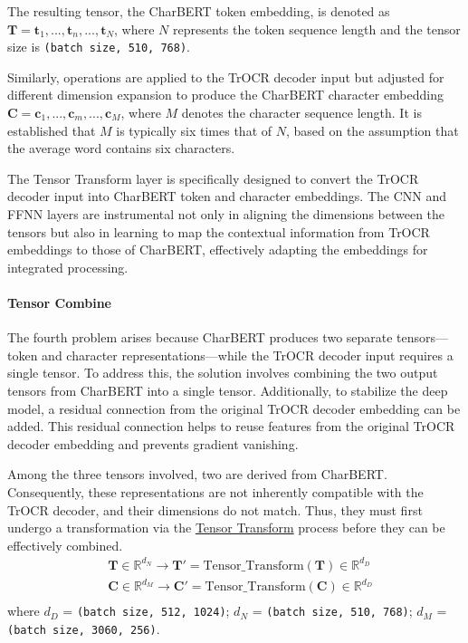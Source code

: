 The resulting tensor, the CharBERT token embedding, is denoted as $\mathbf{T} = {\mathbf{t}_1, ..., \mathbf{t}_n, ..., \mathbf{t}_N}$, where $N$ represents the token sequence length and the tensor size is \texttt{(batch size, 510, 768)}.

Similarly, operations are applied to the TrOCR decoder input but adjusted for different dimension expansion to produce the CharBERT character embedding $\mathbf{C} = {\mathbf{c}_1, ..., \mathbf{c}_m, ..., \mathbf{c}_M}$, where $M$ denotes the character sequence length. It is established that $M$ is typically six times that of $N$, based on the assumption that the average word contains six characters.

The Tensor Transform layer is specifically designed to convert the TrOCR decoder input into CharBERT token and character embeddings. The CNN and FFNN layers are instrumental not only in aligning the dimensions between the tensors but also in learning to map the contextual information from TrOCR embeddings to those of CharBERT, effectively adapting the embeddings for integrated processing.

\paragraph*{Tensor Combine}
\label{par:3_tensor_combine}
The fourth problem arises because CharBERT produces two separate tensors—token and character representations—while the TrOCR decoder input requires a single tensor. To address this, the solution involves combining the two output tensors from CharBERT into a single tensor. Additionally, to stabilize the deep model, a residual connection from the original TrOCR decoder embedding can be added. This residual connection helps to reuse features from the original TrOCR decoder embedding and prevents gradient vanishing.

Among the three tensors involved, two are derived from CharBERT. Consequently, these representations are not inherently compatible with the TrOCR decoder, and their dimensions do not match. Thus, they must first undergo a transformation via the \hyperref[par:3_tensor_transform]{Tensor Transform} process before they can be effectively combined.
\begin{equation} \label{eq:3_tensor_combine_transform}
    \begin{split}
        &\mathbf{T}\in \mathbb{R}^{d_N}\to \mathbf{T}' = \text{Tensor\_Transform}(\mathbf{T})\in \mathbb{R}^{d_D}\\
        &\mathbf{C}\in \mathbb{R}^{d_M}\to \mathbf{C}' = \text{Tensor\_Transform}(\mathbf{C})\in \mathbb{R}^{d_D}\\
    \end{split}
\end{equation}
where $d_D$ = \texttt{(batch size, 512, 1024)}; $d_N$ = \texttt{(batch size, 510, 768)}; $d_M$ = \texttt{(batch size, 3060, 256)}.

